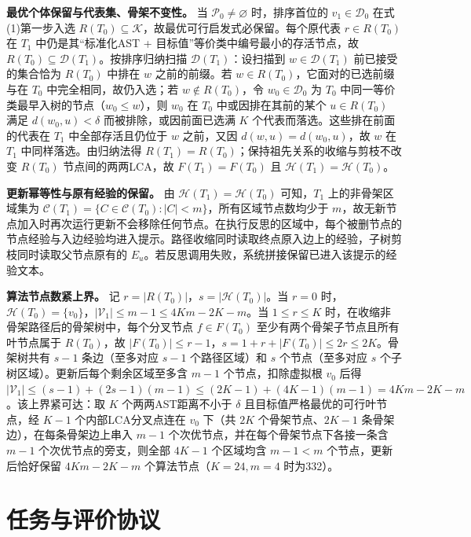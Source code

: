 \documentclass{article}
\begin{document}
\textbf{最优个体保留与代表集、骨架不变性。} 当 \(\mathcal P_0\neq\varnothing\) 时，排序首位的 \(v_1\in\mathcal D_0\) 在式(1)第一步入选 \(R(T_0)\subseteq\mathcal K\)，故最优可行启发式必保留。每个原代表 \(r\in R(T_0)\) 在 \(T_1\) 中仍是其``标准化AST + 目标值''等价类中编号最小的存活节点，故 \(R(T_0)\subseteq\mathcal D(T_1)\)。按排序归纳扫描 \(\mathcal D(T_1)\)：设扫描到 \(w\in\mathcal D(T_1)\) 前已接受的集合恰为 \(R(T_0)\) 中排在 \(w\) 之前的前缀。若 \(w\in R(T_0)\)，它面对的已选前缀与在 \(T_0\) 中完全相同，故仍入选；若 \(w\notin R(T_0)\)，令 \(w_0\in\mathcal D_0\) 为 \(T_0\) 中同一等价类最早入树的节点（\(w_0\leq w\)），则 \(w_0\) 在 \(T_0\) 中或因排在其前的某个 \(u\in R(T_0)\) 满足 \(d(w_0,u)<\delta\) 而被排除，或因前面已选满 \(K\) 个代表而落选。这些排在前面的代表在 \(T_1\) 中全部存活且仍位于 \(w\) 之前，又因 \(d(w,u)=d(w_0,u)\)，故 \(w\) 在 \(T_1\) 中同样落选。由归纳法得 \(R(T_1)=R(T_0)\)；保持祖先关系的收缩与剪枝不改变 \(R(T_0)\) 节点间的两两LCA，故 \(F(T_1)=F(T_0)\) 且 \(\mathcal H(T_1)=\mathcal H(T_0)\)。

\textbf{更新幂等性与原有经验的保留。} 由 \(\mathcal H(T_1)=\mathcal H(T_0)\) 可知，\(T_1\) 上的非骨架区域集为 \(\mathcal C(T_1)=\{C\in\mathcal C(T_0):|C|<m\}\)，所有区域节点数均少于 \(m\)，故无新节点加入时再次运行更新不会移除任何节点。在执行反思的区域中，每个被删节点的节点经验与入边经验均进入提示。路径收缩同时读取终点原入边上的经验，子树剪枝同时读取父节点原有的 \(E_u\)。若反思调用失败，系统拼接保留已进入该提示的经验文本。

\textbf{算法节点数紧上界。} 记 \(r=|R(T_0)|\)，\(s=|\mathcal H(T_0)|\)。当 \(r=0\) 时，\(\mathcal H(T_0)=\{v_0\}\)，\(|\mathcal V_1|\leq m-1\leq 4Km-2K-m\)。当 \(1\leq r\leq K\) 时，在收缩非骨架路径后的骨架树中，每个分叉节点 \(f\in F(T_0)\) 至少有两个骨架子节点且所有叶节点属于 \(R(T_0)\)，故 \(|F(T_0)|\leq r-1\)，\(s=1+r+|F(T_0)|\leq 2r\leq 2K\)。骨架树共有 \(s-1\) 条边（至多对应 \(s-1\) 个路径区域）和 \(s\) 个节点（至多对应 \(s\) 个子树区域）。更新后每个剩余区域至多含 \(m-1\) 个节点，扣除虚拟根 \(v_0\) 后得 \(|\mathcal V_1|\leq(s-1)+(2s-1)(m-1)\leq(2K-1)+(4K-1)(m-1)=4Km-2K-m\)。该上界紧可达：取 \(K\) 个两两AST距离不小于 \(\delta\) 且目标值严格最优的可行叶节点，经 \(K-1\) 个内部LCA分叉点连在 \(v_0\) 下（共 \(2K\) 个骨架节点、\(2K-1\) 条骨架边），在每条骨架边上串入 \(m-1\) 个次优节点，并在每个骨架节点下各接一条含 \(m-1\) 个次优节点的旁支，则全部 \(4K-1\) 个区域均含 \(m-1<m\) 个节点，更新后恰好保留 \(4Km-2K-m\) 个算法节点（\(K=24,m=4\) 时为332）。

\section{任务与评价协议}\label{ux4efbux52a1ux4e0eux8bc4ux4ef7ux534fux8bae}
\end{document}
